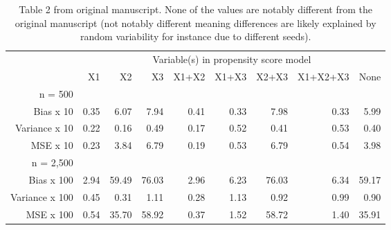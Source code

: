 \documentclass[10,a4paperpaper,]{article}
\begin{document}
\begin{table}[ht]
\centering
\begin{tabular}{rrrrrrrrr}
  \hline
  & \multicolumn{8}{c}{Variable(s) in propensity score model} \\
 & X1 & X2 & X3 & X1+X2 & X1+X3 & X2+X3 & X1+X2+X3 & None \\
 \hline
n = 500 &  &  &  &  &  &  &  &  \\ 
  Bias x 10 & 0.35 & 6.07 & 7.94 & 0.41 & 0.33 & 7.98 & 0.33 & 5.99 \\ 
  Variance x 10 & 0.22 & 0.16 & 0.49 & 0.17 & 0.52 & 0.41 & 0.53 & 0.40 \\ 
  MSE x 10 & 0.23 & 3.84 & 6.79 & 0.19 & 0.53 & 6.79 & 0.54 & 3.98 \\ 
  n = 2,500 &  &  &  &  &  &  &  &  \\ 
  Bias x 100 & 2.94 & 59.49 & 76.03 & 2.96 & 6.23 & 76.03 & 6.34 & 59.17 \\ 
  Variance x 100 & 0.45 & 0.31 & 1.11 & 0.28 & 1.13 & 0.92 & 0.99 & 0.90 \\ 
  MSE x 100 & 0.54 & 35.70 & 58.92 & 0.37 & 1.52 & 58.72 & 1.40 & 35.91 \\ 
   \hline
\end{tabular}
\caption{Table 2 from original manuscript. None of the values are notably different from the original manuscript (not notably different meaning differences are likely explained by random variability for instance due to different seeds).}
\end{table}
\end{document}
